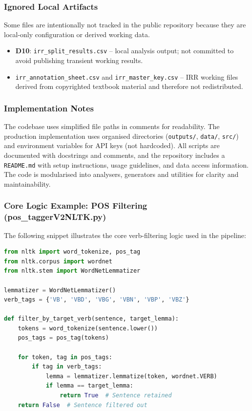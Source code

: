 \documentclass[11pt,a4paper]{article}
\begin{document}
\subsubsection*{Ignored Local Artifacts}

Some files are intentionally not tracked in the public repository because they are local-only configuration or derived working data.

\begin{itemize}
\item \textbf{D10}: \texttt{irr\_split\_results.csv} -- local analysis output; not committed to avoid publishing transient working results.\label{script:irr-split-results}
\item \texttt{irr\_annotation\_sheet.csv} and \texttt{irr\_master\_key.csv} -- IRR working files derived from copyrighted textbook material and therefore not redistributed.
\end{itemize}

\subsubsection*{Implementation Notes}

The codebase uses simplified file paths in comments for readability. The production implementation uses organised directories (\texttt{outputs/}, \texttt{data/}, \texttt{src/}) and environment variables for API keys (not hardcoded). All scripts are documented with docstrings and comments, and the repository includes a \texttt{README.md} with setup instructions, usage guidelines, and data access information. The code is modularised into analysers, generators and utilities for clarity and maintainability.

\subsubsection*{Core Logic Example: POS Filtering (pos\_taggerV2NLTK.py)}

The following snippet illustrates the core verb-filtering logic used in the pipeline:

\begin{lstlisting}[language=Python, caption={Core POS filtering logic}, label=lst:pos-core]
from nltk import word_tokenize, pos_tag
from nltk.corpus import wordnet
from nltk.stem import WordNetLemmatizer

lemmatizer = WordNetLemmatizer()
verb_tags = {'VB', 'VBD', 'VBG', 'VBN', 'VBP', 'VBZ'}

def filter_by_target_verb(sentence, target_lemma):
    tokens = word_tokenize(sentence.lower())
    pos_tags = pos_tag(tokens)
    
    for token, tag in pos_tags:
        if tag in verb_tags:
            lemma = lemmatizer.lemmatize(token, wordnet.VERB)
            if lemma == target_lemma:
                return True  # Sentence retained
    return False  # Sentence filtered out
\end{lstlisting}
\end{document}

